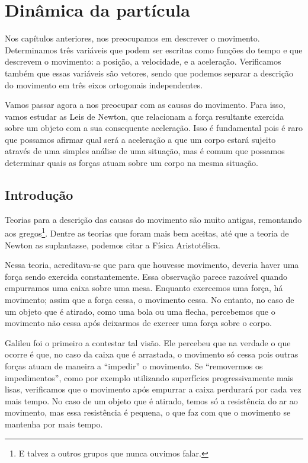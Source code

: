 \chapter{Dinâmica da partícula}
\label{Chap:Dinâmica}


\begin{fullwidth}
{\it

Nos capítulos anteriores, nos preocupamos em descrever o movimento. Determinamos três variáveis que podem ser escritas como funções do tempo e que descrevem o movimento: a posição, a velocidade, e a aceleração. Verificamos também que essas variáveis são vetores, sendo que podemos separar a descrição do movimento em três eixos ortogonais independentes.

Vamos passar agora a nos preocupar com as causas do movimento. Para isso, vamos estudar as Leis de Newton, que relacionam a força resultante exercida sobre um objeto com a sua consequente aceleração. Isso é fundamental pois é raro que possamos afirmar qual será a aceleração a que um corpo estará sujeito através de uma simples análise de uma situação, mas é comum que possamos determinar quais as forças atuam sobre um corpo na mesma situação.
}
\end{fullwidth}

\section{Introdução}

Teorias para a descrição das causas do movimento são muito antigas, remontando aos gregos\footnote{E talvez a outros grupos que nunca ouvimos falar.}. Dentre as teorias que foram mais bem aceitas, até que a teoria de Newton as suplantasse, podemos citar a Física Aristotélica.

Nessa teoria, acreditava-se que para que houvesse movimento, deveria haver uma força sendo exercida constantemente. Essa observação parece razoável quando empurramos uma caixa sobre uma mesa. Enquanto exercemos uma força, há movimento; assim que a força cessa, o movimento cessa. No entanto, no caso de um objeto que é atirado, como uma bola ou uma flecha, percebemos que o movimento não cessa após deixarmos de exercer uma força sobre o corpo.

Galileu foi o primeiro a contestar tal visão. Ele percebeu que na verdade o que ocorre é que, no caso da caixa que é arrastada, o movimento só cessa pois outras forças atuam de maneira a ``impedir'' o movimento. Se ``removermos os impedimentos'', como por exemplo utilizando superfícies progressivamente mais lisas, verificamos que o movimento após empurrar a caixa perdurará por cada vez mais tempo. No caso de um objeto que é atirado, temos só a resistência do ar ao movimento, mas essa resistência é pequena, o que faz com que o movimento se mantenha por mais tempo.

